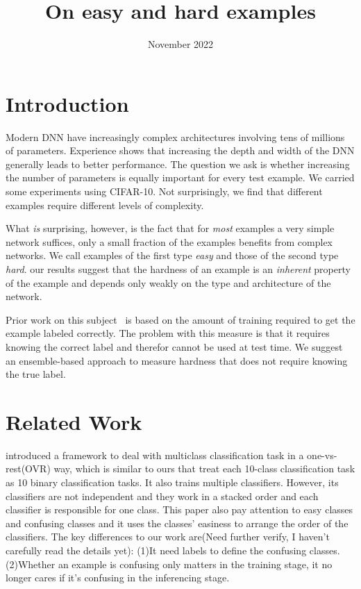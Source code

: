 \documentclass{article}
\title{On easy and hard examples}
\author{}
\date{November 2022}
\begin{document}
\maketitle

\section{Introduction}

Modern DNN have increasingly complex architectures involving tens of millions of parameters. Experience shows that increasing the depth and width of the DNN generally leads to better performance. The question we ask is whether increasing the number of parameters is equally important for every test example. We carried some experiments using CIFAR-10. Not surprisingly, we find that different examples require different levels of complexity. 

What {\em is} surprising, however, is the fact that for {\em most} examples a very simple network suffices, only a small fraction of the examples benefits from complex networks. We call examples of the first type {\em easy} and those of the second type {\em hard}. our results suggest that the hardness of an example is an {\em inherent} property of the example and depends only weakly on the type and architecture of the network.

Prior work on this subject~\cite{} is based on the amount of training required to get the example labeled correctly. The problem with this measure is that it requires knowing the correct label and therefor cannot be used at test time. We suggest an ensemble-based approach to measure hardness that does not require knowing the true label.





\section{Related Work}
\cite{stacked_ovr}introduced a framework to deal with multiclass classification task in a one-vs-rest(OVR) way, which is similar to ours that treat each 10-class classification task as 10 binary classification tasks. It also trains multiple classifiers. However, its classifiers are not independent and they work in a stacked order and each classifier is responsible for one class. This paper also pay attention to easy classes and confusing classes and it uses the classes’ easiness to arrange the order of the classifiers.
The key differences to our work are(Need further verify, I haven’t carefully read the details yet): (1)It need labels to define the confusing classes. (2)Whether an example is confusing only matters in the training stage, it no longer cares if it’s confusing in the inferencing stage.
\end{document}
